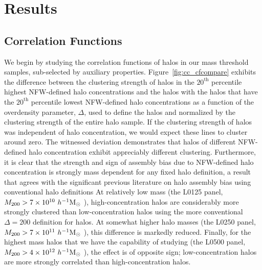 \documentclass[usenatbib]{mnras}
\begin{document}
\section[]{Results}
\label{section:results}


\subsection{Correlation Functions}
\label{sub:cfresults}

We begin by studying the correlation functions of halos in our mass threshold samples, sub-selected by auxiliary
properties. Figure~\ref{fig:cc_cfcompare} exhibits the difference between the clustering strength of halos in the
$20^{\mathrm{th}}$ percentile highest NFW-defined halo concentrations and the halos with the halos that have the
$20^{\mathrm{th}}$ percentile lowest NFW-defined halo concentrations as a function of the overdensity parameter, $\Delta$, used to
define the halos and normalized by the clustering strength of the entire halo
sample.  
If the clustering strength of halos was independent of halo concentration, we 
would expect these lines to cluster around zero. The witnessed deviation
demonstrates that halos of different NFW-defined halo concentration exhibit appreciably different clustering. 
Furthermore, it is clear that the strength and sign of assembly bias due to NFW-defined halo concentration is 
strongly mass dependent for any fixed halo definition, 
a result that agrees with the significant previous literature on halo assembly bias using conventional halo definitions 
\citep{wechsler_etal02, gao_etal05, zentner07, wechsler_etal06, harker_etal06, croton_etal07, dalal_etal08, mao_etal15, sunayama_etal16} 
At relatively low mass (the L0125 panel, 
$M_{200} > 7 \times 10^{10} \ h^{-1}\mathrm{M}_{\odot}~$), high-concentration halos are considerably 
more strongly clustered than low-concentration halos using the more 
conventional $\Delta = 200$ definition for halos. At somewhat higher halo masses 
(the L0250 panel, $M_{200} > 7\times 10^{11} \ h^{-1}\mathrm{M}_{\odot}~$), this difference is markedly reduced. 
Finally, for the highest mass halos that we have
the capability of studying (the L0500 panel, $M_{200} > 4 \times 10^{12} \ h^{-1}\mathrm{M}_{\odot}~$), 
the effect is of opposite sign; low-concentration halos are more strongly correlated 
than high-concentration halos.
\end{document}
